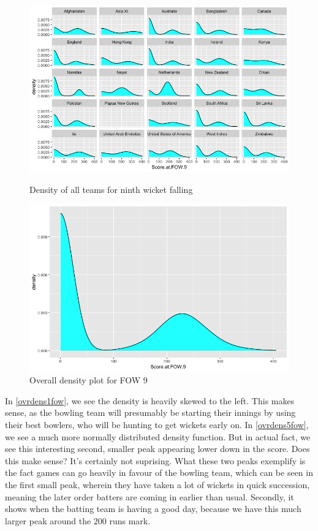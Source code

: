 \begin{figure}[h]
    \centering
    \begin{minipage}{0.4\textwidth}
        \centering
        \includegraphics[scale=0.3]{figures/fow9density.png}
        \caption{Density of all teams for ninth wicket falling}
        \label{alldens9fow}
    \end{minipage}
    \begin{minipage}{0.4\textwidth}
        \centering
        \includegraphics[scale=0.3]{figures/fow9densfull.png}
        \caption{Overall density plot for FOW 9}
        \label{ovrdens9fow}
    \end{minipage}
\end{figure}

In \ref{ovrdens1fow}, we see the density is heavily skewed to the left. This makes sense, as the bowling team will presumably be starting 
their innings by using their best bowlers, who will be hunting to get wickets early on. In \ref{ovrdens5fow}, we see a much more normally distributed
density function. But in actual fact, we see this interesting second, smaller peak appearing lower down in the score. Does this make sense? It's certainly 
not suprising. What these two peaks exemplify is the fact games can go heavily in favour of the bowling team, which can be seen in the first small peak,
wherein they have taken a lot of wickets in quick succession, meaning the later order batters are coming in earlier than usual. Secondly, it shows when the 
batting team is having a good day, because we have this much larger peak around the 200 runs mark.\\

